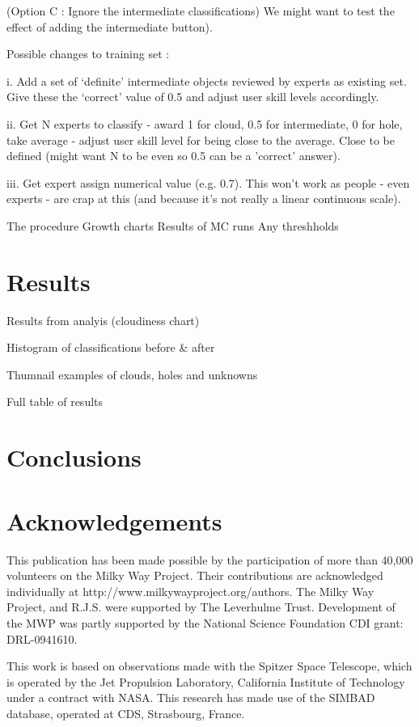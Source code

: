 \documentclass[a4,useAMS,usenatbib]{mn2e}
\begin{document}
	(Option C : Ignore the intermediate classifications) We might want to test the effect of adding the intermediate button). 
	
	Possible changes to training set :
	
		i. Add a set of `definite' intermediate objects reviewed by experts as existing set. Give these the `correct' value of 0.5 and adjust user skill levels accordingly.
		
		ii. Get N experts to classify - award 1 for cloud, 0.5 for intermediate, 0 for hole, take average - adjust user skill level for being close to the average. Close to be defined (might want N to be even so 0.5 can be a 'correct' answer). 
		
		iii. Get expert assign numerical value (e.g. 0.7). This won't work as people - even experts - are crap at this (and because it's not really a linear continuous scale). 
		
		
	

The procedure
Growth charts
Results of MC runs
Any threshholds


\section{Results}
Results from analyis (cloudiness chart)

Histogram of classifications before \& after

Thumnail examples of clouds, holes and unknowns

Full table of results

\section{Conclusions}


\section{Acknowledgements}
This publication has been made possible by the participation of more than 40,000 volunteers on the Milky Way Project. Their contributions are acknowledged individually at http://www.milkywayproject.org/authors. The Milky Way Project, and R.J.S. were supported by The Leverhulme Trust. Development of the MWP was partly supported by the National Science Foundation CDI grant: DRL-0941610. 

This work is based on observations made with the Spitzer Space Telescope, which is operated by the Jet Propulsion Laboratory, California Institute of Technology under a contract with NASA. This research has made use of the SIMBAD database, operated at CDS, Strasbourg, France.
\end{document}
